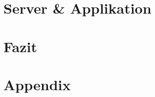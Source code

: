\documentclass[a4paper, 11pt, oneside, onecolumn, final, openany]{report}
\begin{document}
    \chapter{Server \& Applikation}
    

    \chapter{Fazit}
    

    \newpage

    
    

    \chapter{Appendix}
    
\end{document}

